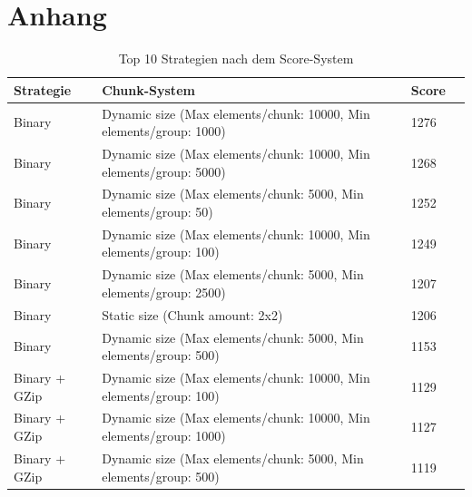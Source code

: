 \chapter{Anhang}\label{ch:appendix}

\begin{table}[htp]
    \centering
    \caption{Top 10 Strategien nach dem Score-System}
    \begin{tabular}{|l|l|l|l|}
    \hline
        Strategie & Chunk-System & Score \\
        \hline
        Binary & Dynamic size (Max elements/chunk: 10000, Min elements/group: 1000) & 1276\\
        Binary & Dynamic size (Max elements/chunk: 10000, Min elements/group: 5000) & 1268\\
        Binary & Dynamic size (Max elements/chunk: 5000, Min elements/group: 50) & 1252\\
        Binary & Dynamic size (Max elements/chunk: 10000, Min elements/group: 100) & 1249\\
        Binary & Dynamic size (Max elements/chunk: 5000, Min elements/group: 2500) & 1207\\
        Binary & Static size (Chunk amount: 2x2) & 1206\\
        Binary & Dynamic size (Max elements/chunk: 5000, Min elements/group: 500) & 1153\\
        Binary + GZip & Dynamic size (Max elements/chunk: 10000, Min elements/group: 100) & 1129\\
        Binary + GZip & Dynamic size (Max elements/chunk: 10000, Min elements/group: 1000) & 1127\\
        Binary + GZip & Dynamic size (Max elements/chunk: 5000, Min elements/group: 500) & 1119\\ 
        \hline
    \end{tabular}
    \label{tbl:topStrat}
\end{table}

